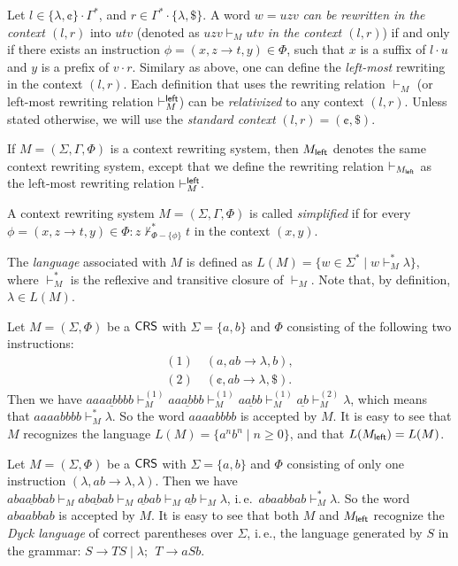 \begin{definition}
Let $l \in \{\lambda, \cent\} \cdot \Gamma^*$, and $r \in \Gamma^* \cdot \{\lambda, \$\}$. A word $w = uzv$ \emph{can be rewritten in the context $(l, r)$} into $utv$ (denoted as $uzv \vdash_M utv$ \emph{in the context $(l, r)$}) if and only if there exists an instruction $\phi = (x, z \to t, y) \in \Phi$, such that $x$ is a suffix of $l \cdot u$ and $y$ is a prefix of $v \cdot r$. Similary as above, one can define the \emph{left-most} rewriting in the context $(l, r)$. Each definition that uses the rewriting relation $\vdash_M$ (or left-most rewriting relation $\vdash^{\sf left}_M$) can be \emph{relativized} to any context $(l, r)$. Unless stated otherwise, we will use the \emph{standard context} $(l, r) = (\cent, \$)$.

If $M = (\Sigma, \Gamma, \Phi)$ is a context rewriting system, then $M_{\sf left}$ denotes the same context rewriting system, except that we define the rewriting relation $\vdash_{M_{\sf left}}$ as the left-most rewriting relation $\vdash^{\sf left}_M$.

A context rewriting system $M = (\Sigma, \Gamma, \Phi)$ is called \emph{simplified} if for every $\phi = (x, z \to t, y) \in \Phi: z \not\vdash_{\Phi - \{\phi\}}^* t$ in the context $(x, y)$.

The \emph{language} associated with $M$ is defined as $L(M) = \{w \in \Sigma^* \mid w \vdash_M^* \lambda \}$, where $\vdash_M^*$ is the reflexive and transitive closure of $\vdash_M$. Note that, by definition, $\lambda \in L(M)$.
\end{definition}

\begin{example}\label{example:a^n_b^n}
Let $M = (\Sigma, \Phi)$ be a $\textup{\sf CRS\/}$ with $\Sigma = \{a, b\}$ and $\Phi$ consisting of the following two instructions:
$$
\begin{array}{l}
(1) \quad (a, ab \to \lambda, b),\\
(2) \quad (\cent, ab \to \lambda, \$).
\end{array}
$$
Then we have $aaa\underline{ab}bbb \vdash^{(1)}_{M} aa\underline{ab}bb \vdash^{(1)}_{M} a\underline{ab}b \vdash^{(1)}_{M} \underline{ab} \vdash^{(2)}_{M} \lambda$, which means that $aaaabbbb \vdash_{M}^* \lambda$. So the word $aaaabbbb$ is accepted by $M$. It is easy to see that $M$ recognizes the language $L(M) = \{a^n b^n \mid n\ge 0\}$, and that $L(M_{\sf left}) = L(M)$.
\end{example}

\begin{example}\label{example:dyck}
Let $M = (\Sigma, \Phi)$ be a $\textup{\sf CRS\/}$ with $\Sigma = \{a, b\}$ and $\Phi$ consisting of only one instruction $(\lambda, ab \to \lambda, \lambda)$. Then we have $aba\underline{ab}bab \vdash_M ab\underline{ab}ab \vdash_M \underline{ab}ab \vdash_M \underline{ab} \vdash_M \lambda$, i.\,e.\ $abaabbab \vdash_M^* \lambda$. So the word $abaabbab$ is accepted by $M$. It is easy to see that both $M$ and $M_{\sf left}$ recognize the \emph{Dyck language} of correct parentheses over $\Sigma$, i.\,e., the language generated by $S$ in the grammar: $S \to TS \mid \lambda; \ \ T \to a S b$.
\end{example}

